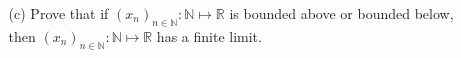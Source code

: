 \documentclass[letterpaper,12pt]{article}
\theoremstyle{definition}
\begin{document}
\pagebreak
\begin{enumerate}
    \item[] \begin{enumerate}
        \item[(c)] Prove that if $(x_n)_{n\in\mathbb{N}} : \mathbb{N} \mapsto \mathbb{R}$ is bounded above or bounded below, then $(x_n)_{n \in \mathbb{N}} : \mathbb{N} \mapsto \mathbb{R}$ has a finite limit.
    \end{enumerate}
\end{enumerate}
\end{document}
